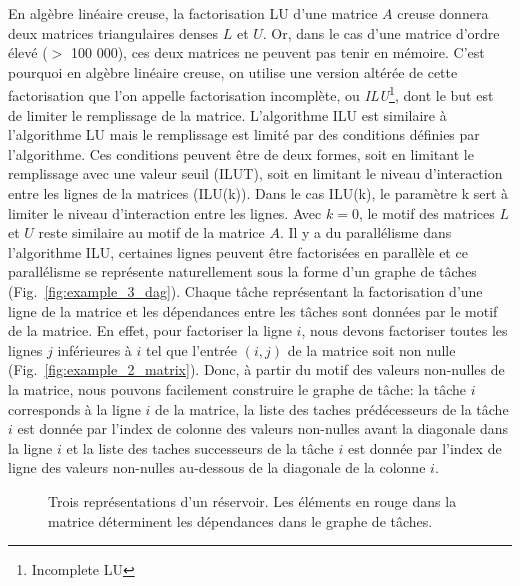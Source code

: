 En algèbre linéaire creuse, la factorisation LU d'une matrice $A$ creuse donnera deux matrices triangulaires denses $L$ et $U$.
%
Or, dans le cas d'une matrice d'ordre élevé ($>$ 100 000), ces deux matrices ne peuvent pas tenir en mémoire.
%
C'est pourquoi en algèbre linéaire creuse, on utilise une version altérée de cette factorisation que l'on appelle factorisation incomplète, ou {\em ILU}\footnote{Incomplete LU}, dont le but est de limiter le remplissage de la matrice.
%
L'algorithme ILU est similaire à l'algorithme LU mais le remplissage est limité par des conditions définies par l'algorithme.
%
Ces conditions peuvent être de deux formes, soit en limitant le remplissage avec une valeur seuil (ILUT), soit en limitant le niveau d'interaction entre les lignes de la matrices (ILU(k)).
%
Dans le cas ILU(k), le paramètre k sert à limiter le niveau d'interaction entre les lignes.
%
Avec $k=0$, le motif des matrices $L$ et $U$ reste similaire au motif de la matrice $A$.
%
Il y a du parallélisme dans l'algorithme ILU, certaines lignes peuvent être factorisées en parallèle et ce parallélisme se représente naturellement sous la forme d'un graphe de tâches (Fig.~\ref{fig:example_3_dag}).
%
Chaque tâche représentant la factorisation d'une ligne de la matrice et les dépendances entre les tâches sont données par le motif de la matrice.
%
En effet, pour factoriser la ligne $i$, nous devons factoriser toutes les lignes $j$ inférieures à $i$ tel que l'entrée $(i,j)$ de la matrice soit non nulle (Fig.~\ref{fig:example_2_matrix}).
%
Donc, à partir du motif des valeurs non-nulles de la matrice, nous pouvons facilement construire le graphe de tâche:
%
la tâche $i$ corresponds à la ligne $i$ de la matrice, la liste des taches prédécesseurs de la tâche $i$ est donnée par l'index de colonne des valeurs non-nulles avant la diagonale dans la ligne $i$ et la liste des taches successeurs de la tâche $i$ est donnée par l'index de ligne des valeurs non-nulles au-dessous de la diagonale de la colonne $i$.

\begin{figure}[!ht]
     \begin{center}
    \end{center}
    \caption{Trois représentations d'un réservoir. Les éléments en rouge dans la matrice déterminent les dépendances dans le graphe de tâches.}
    \label{fig:exemple_3_dag}
\end{figure}

